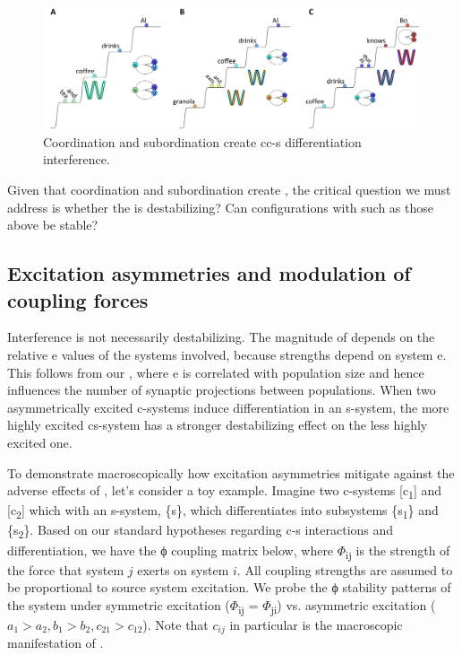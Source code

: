   
\begin{figure}
\includegraphics[width=\textwidth]{figures/Tilsen-img94.png}
\caption{Coordination and subordination create cc-s differentiation interference.}
\label{fig:4:44}
\end{figure}
 

  Given that coordination and subordination create , the critical question we must address is whether the  is destabilizing? Can configurations with  such as those above be stable? 

\subsection{Excitation asymmetries and modulation of coupling forces}

Interference is not necessarily destabilizing. The magnitude of  depends on the relative e values of the systems involved, because  strengths depend on system e. This follows from our , where e is correlated with population size and hence influences the number of synaptic projections between populations. When two asymmetrically excited c-systems induce differentiation  in an s-system, the more highly excited cs-system has a stronger destabilizing effect on the less highly excited one.

  To demonstrate macroscopically how excitation asymmetries mitigate against the adverse effects of , let's consider a toy example. Imagine two c-systems [c\textsubscript{1}] and [c\textsubscript{2}] which  with an s-system, \{s\}, which differentiates into subsystems \{s\textsubscript{1}\} and \{s\textsubscript{2}\}. Based on our standard hypotheses regarding c-s interactions and differentiation, we have the ϕ coupling matrix below, where $\Phi$\textsubscript{ij} is the strength of the force that system $j$ exerts on system $i$. All coupling strengths are assumed to be proportional to source system excitation. We probe the ϕ stability patterns of the system under symmetric excitation ($\Phi$\textsubscript{ij} = $\Phi$\textsubscript{ji}) vs. asymmetric excitation ($a_1 > a_2, b_1 > b_2, c_{21} > c_{12}$). Note that $c_{ij}$ in particular is the macroscopic manifestation of  .

